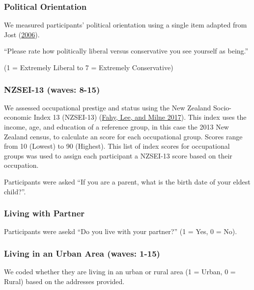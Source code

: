 \documentclass[
  singlecolumn]{report}
\begin{document}
\hypertarget{political-orientation}{%
\subsubsection{Political Orientation}\label{political-orientation}}

We measured participants' political orientation using a single item
adapted from Jost (\protect\hyperlink{ref-jost_end_2006-1}{2006}).

``Please rate how politically liberal versus conservative you see
yourself as being.''

(1 = Extremely Liberal to 7 = Extremely Conservative)

\hypertarget{nzsei-13-waves-8-15}{%
\subsubsection{NZSEI-13 (waves: 8-15)}\label{nzsei-13-waves-8-15}}

We assessed occupational prestige and status using the New Zealand
Socio-economic Index 13 (NZSEI-13)
(\protect\hyperlink{ref-fahy2017}{Fahy, Lee, and Milne 2017}). This
index uses the income, age, and education of a reference group, in this
case the 2013 New Zealand census, to calculate an score for each
occupational group. Scores range from 10 (Lowest) to 90 (Highest). This
list of index scores for occupational groups was used to assign each
participant a NZSEI-13 score based on their occupation.

Participants were asked ``If you are a parent, what is the birth date of
your eldest child?''.

\hypertarget{living-with-partner}{%
\subsubsection{Living with Partner}\label{living-with-partner}}

Participants were asekd ``Do you live with your partner?'' (1 = Yes, 0 =
No).

\hypertarget{living-in-an-urban-area-waves-1-15}{%
\subsubsection{Living in an Urban Area (waves:
1-15)}\label{living-in-an-urban-area-waves-1-15}}

We coded whether they are living in an urban or rural area (1 = Urban, 0
= Rural) based on the addresses provided.
\end{document}
